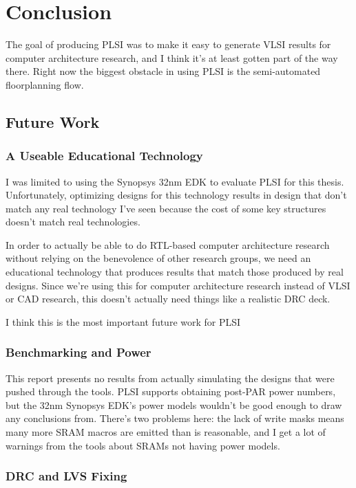 \documentclass{article}
\begin{document}
\chapter{Conclusion}

The goal of producing PLSI was to make it easy to generate VLSI results for
computer architecture research, and I think it's at least gotten part of the
way there.  Right now the biggest obstacle in using PLSI is the
semi-automated floorplanning flow.

\section{Future Work}

\subsection{A Useable Educational Technology}

I was limited to using the Synopsys 32nm EDK to evaluate PLSI for this thesis.
Unfortunately, optimizing designs for this technology results in design that
don't match any real technology I've seen because the cost of some key
structures doesn't match real technologies.

In order to actually be able to do RTL-based computer architecture research
without relying on the benevolence of other research groups, we need an
educational technology that produces results that match those produced by real
designs.  Since we're using this for computer architecture research instead of
VLSI or CAD research, this doesn't actually need things like a realistic DRC
deck.

I think this is the most important future work for PLSI

\subsection{Benchmarking and Power}

This report presents no results from actually simulating the designs that were
pushed through the tools.  PLSI supports obtaining post-PAR power numbers, but
the 32nm Synopsys EDK's power models wouldn't be good enough to draw any
conclusions from.  There's two problems here: the lack of write masks means
many more SRAM macros are emitted than is reasonable, and I get a lot of
warnings from the tools about SRAMs not having power models.

\subsection{DRC and LVS Fixing}
\end{document}
